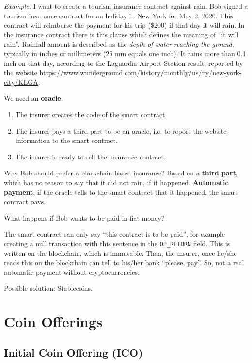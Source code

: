 \emph{Example.} I want to create a tourism insurance contract against rain. Bob signed a tourism insurance contract for an holiday in New York for May 2, 2020. This contract will reimburse the payment for his trip (\$200) if that day it will rain. In the insurance contract there is this clause which defines the meaning of ``it will rain''. Rainfall amount is described as the \emph{depth of water reaching the ground}, typically in inches or millimeters (25 mm equals one inch). It rains more than 0.1 inch on that day, according to the Laguardia Airport Station result, reported by the website \url{https://www.wunderground.com/history/monthly/us/ny/new-york-city/KLGA}.

We need an \textbf{oracle}.
\begin{enumerate}
	\item The insurer creates the code of the smart contract.
	\item The insurer pays a third part to be an oracle, i.e. to report the website information to the smart contract.
	\item The insurer is ready to sell the insurance contract.
\end{enumerate}

Why Bob should prefer a blockchain-based insurance? Based on a \textbf{third part}, which has no reason to say that it did not rain, if it happened.
\textbf{Automatic payment}: if the oracle tells to the smart contract that it happened, the smart contract pays.

What happens if Bob wants to be paid in fiat money?

The smart contract can only say ``this contract is to be paid'', for example creating a null transaction with this sentence in the \texttt{OP\_RETURN} field. This is written on the blockchain, which is immutable. Then, the insurer, once he/she reads this on the blockchain can tell to his/her bank ``please, pay''.
So, not a real automatic payment without cryptocurrencies.

Possible solution: Stablecoins.

\section{Coin Offerings}

\subsection{Initial Coin Offering (ICO)}

